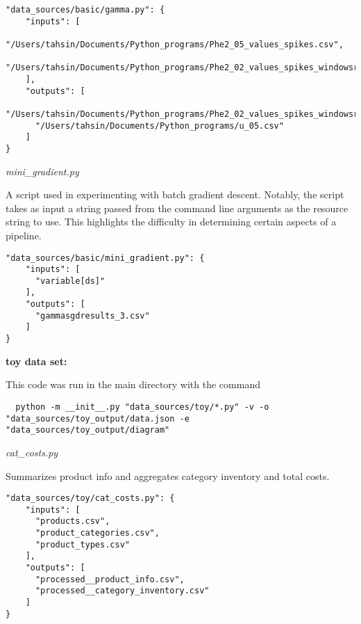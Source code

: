 \documentclass{llncs}
\newcommand{\+}{\discretionary{\mbox{${\bm\cdot}\mkern-1mu$}}{}{}}
\begin{document}
\begin{lstlisting}
"data_sources/basic/gamma.py": {
    "inputs": [
      "/Users/tahsin/Documents/Python_programs/Phe2_05_values_spikes.csv",
      "/Users/tahsin/Documents/Python_programs/Phe2_02_values_spikes_windowsresults_tranposed.csv"
    ],
    "outputs": [
      "/Users/tahsin/Documents/Python_programs/Phe2_02_values_spikes_windowsresults_reducted.csv",
      "/Users/tahsin/Documents/Python_programs/u_05.csv"
    ]
}
\end{lstlisting}


\begin{description}
   \item \textit{mini\_gradient.py}
   \item[Description:] A script used in experimenting with batch gradient descent. Notably, the script takes as input a string passed from the command line arguments as the resource string to use. This highlights the difficulty in determining certain aspects of a pipeline.
   \item[Results:] 
\end{description}
\begin{lstlisting}
"data_sources/basic/mini_gradient.py": {
    "inputs": [
      "variable[ds]"
    ],
    "outputs": [
      "gammasgdresults_3.csv"
    ]
}
   \end{lstlisting}
   
\textbf{toy data set:}

  This code was run in the main directory with the command 
  
  \begin{lstlisting}
  python -m __init__.py "data_sources/toy/*.py" -v -o "data_sources/toy_output/data.json -e "data_sources/toy_output/diagram"
\end{lstlisting}

\begin{description}
   \item \textit{cat\_costs.py}
   \item[Description:] Summarizes product info and aggregates category inventory and total costs.
   \item[Results:] 
\end{description}
\begin{lstlisting}
"data_sources/toy/cat_costs.py": {
    "inputs": [
      "products.csv",
      "product_categories.csv",
      "product_types.csv"
    ],
    "outputs": [
      "processed__product_info.csv",
      "processed__category_inventory.csv"
    ]
}
   \end{lstlisting}
\end{document}
